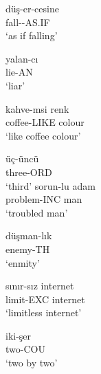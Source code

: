 \begin{exe}
    \ex \label{derivationalsuffixes}
    \begin{xlist}
    \begin{multicols}{2}
       
        \ex 
        \gll 
        düş-er-cesine \\ fall-{\Aor}-AS.IF \\
        \glt `as if falling'
        
        \ex 
        \gll 
        yalan-cı \\ lie-AN \\ 
        \glt `liar'
        
        \ex 
        \gll 
        kahve-msi renk \\ coffee-LIKE colour \\
        \glt `like coffee colour'

        \ex 
        \gll 
        üç-üncü \\ three-ORD \\
        \glt `third'
\columnbreak
        \ex 
        \gll 
        sorun-lu adam \\ problem-INC man \\
        \glt `troubled man'
        
        \ex 
        \gll 
        düşman-lık \\ enemy-TH \\
        \glt `enmity'
        
        \ex 
        \gll 
        sınır-sız internet \\ limit-EXC internet \\
        \glt `limitless internet'
        
        \ex 
        \gll 
        iki-şer \\ two-COU \\
        \glt `two by two'
        
    \end{multicols}
    \end{xlist}
\end{exe}


